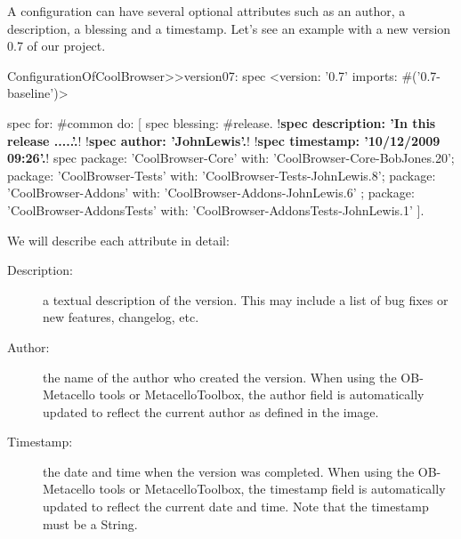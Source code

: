 \documentclass[a4paper,10pt,twoside]{book}
\begin{document}
 
A configuration can have several optional attributes such as    
an author, a description, a blessing and a timestamp.  Let's see an example with a new version 0.7 of our project.
 
\begin{code}{}
ConfigurationOfCoolBrowser>>version07: spec 
       <version: '0.7' imports: #('0.7-baseline')>
       
       spec for: #common do: [
              spec blessing: #release.
              !\textbf{spec description: 'In this release .....'.}!
              !\textbf{spec author: 'JohnLewis'.}!
              !\textbf{spec timestamp: '10/12/2009 09:26'.}!
              spec 
                     package: 'CoolBrowser-Core' with: 'CoolBrowser-Core-BobJones.20';
                     package: 'CoolBrowser-Tests' with: 'CoolBrowser-Tests-JohnLewis.8';
                     package: 'CoolBrowser-Addons' with: 'CoolBrowser-Addons-JohnLewis.6' ;
                     package: 'CoolBrowser-AddonsTests' with: 'CoolBrowser-AddonsTests-JohnLewis.1' ].
\end{code}
 
We will describe each attribute in detail:
 
\begin{description}

\item[Description:] a textual description of the version. This may include a list of bug fixes or new features, changelog, etc.
\item[Author:] the name of the author who created the version. When using the OB-Metacello tools or MetacelloToolbox, the author field is automatically updated to reflect the current author as defined in the image.
\item[Timestamp:] the date and time when the version was completed. When using the OB-Metacello tools or MetacelloToolbox, the timestamp field is automatically updated to reflect the current date and time. Note that the timestamp must be a String.

\end{description}
\end{document}
